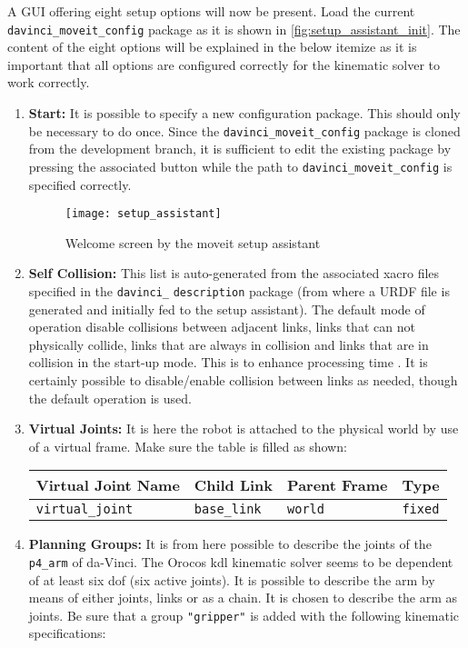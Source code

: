 A GUI offering eight setup options will now be present. Load the current \texttt{davinci\_moveit\_config} package as it is shown in \autoref{fig:setup_assistant_init}. The content of the eight options will be explained in the below itemize as it is important that all options are configured correctly for the kinematic solver to work correctly.
\begin{enumerate}
\item \textbf{Start:} It is possible to specify a new configuration package. This should only be necessary to do once. Since the \texttt{davinci\_moveit\_config} package is cloned from the development branch, it is sufficient to edit the existing package by pressing the associated button while the path to \texttt{davinci\_moveit\_config} is specified correctly.
\begin{figure}[H]
	\texttt{[image: setup\_assistant]}
	\caption{Welcome screen by the moveit setup assistant}
	\label{fig:setup_assistant_init}
\end{figure}
\item \textbf{Self Collision:}
This list is auto-generated from the associated xacro files specified in the \texttt{davinci\_} \texttt{description} package (from where a URDF file is generated and initially fed to the setup assistant). The default mode of operation disable collisions between adjacent links, links that can not physically collide, links that are always in collision and links that are in collision in the start-up mode. This is to enhance processing time \citep{bib:setup_assistant}. It is certainly possible to disable/enable collision between links as needed, though the default operation is used.	
\item \textbf{Virtual Joints:} It is here the robot is attached to the physical world by use of a virtual frame. Make sure the table is filled as shown:
\begin{table}[H]
\hspace{1cm}\begin{tabular}{l|l|l|l}
\textbf{Virtual Joint Name} & \textbf{Child Link}  & \textbf{Parent Frame}  & \textbf{Type}   \\
\hline
 \texttt{virtual\_joint} & \texttt{base\_link}  & \texttt{world}  &  \texttt{fixed} \\
\end{tabular}
\end{table}
\item \textbf{Planning Groups:} It is from here possible to describe the joints of the \texttt{p4\_arm} of da-Vinci. The Orocos \gls{kdl} kinematic solver seems to be dependent of at least six \gls{dof} (six active joints). It is possible to describe the arm by means of either joints, links or as a chain. It is chosen to describe the arm as joints. Be sure that a group \texttt{"gripper"} is added with the following kinematic specifications:

\end{enumerate}

